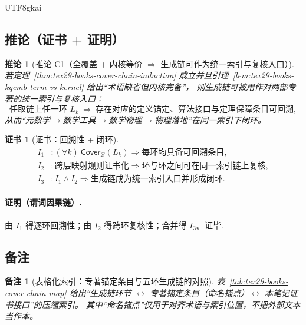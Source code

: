 \documentclass[12pt]{article}
\newtheorem{corollary}{推论}[section]
\newtheorem{remark}{备注}[section]
\newtheorem{Certificate}{证书}[section]
\newcommand{\KouJing}{\texorpdfstring{表述约定}{表述约定}}
\begin{document}
\begin{CJK*}{UTF8}{gkai}
\subsection{推论（证书 + 证明）}
\label{subsec:tex29-books-cover-chain-corollary}

\begin{corollary}[推论 C1（全覆盖 + 内核等价 $\Rightarrow$ 生成链可作为统一索引与复核入口）]
\label{cor:tex29-books-cover-chain-index}
若定理~\ref{thm:tex29-books-cover-chain-induction} 成立并且引理~\ref{lem:tex29-books-kqemb-term-vs-kernel} 给出“术语缺省但内核完备”，
则生成链可被用作对两部专著的统一索引与复核入口：
\[
  \text{任取链上任一环 }L_k\ \Rightarrow\ \text{存在对应的定义锚定、算法接口与定理保障条目可回溯},
\]
从而“元数学$\to$数学工具$\to$数学物理$\to$物理落地”在同一索引下闭环。
\end{corollary}

\begin{Certificate}[证书：回溯性 + 闭环]
\label{cert:tex29-books-cover-chain-index}
\[
\begin{aligned}
  I_1 &: (\forall k)\ \mathsf{Cover}_{\mathcal{B}}(L_k)\Rightarrow \text{每环均具备可回溯条目},\\
  I_2 &: \text{跨层映射规则证书化}\Rightarrow \text{环与环之间可在同一索引链上复核},\\
  I_3 &: I_1\wedge I_2\Rightarrow \text{生成链成为统一索引入口并形成闭环}.
\end{aligned}
\]
\end{Certificate}

\paragraph{证明（谓词因果链）.}
由 $I_1$ 得逐环回溯性；由 $I_2$ 得跨环复核性；合并得 $I_3$。证毕.

\subsection{备注}
\label{subsec:tex29-books-cover-chain-remarks}

\begin{remark}[表格化索引：专著锚定条目与五环生成链的对照]
表~\ref{tab:tex29-books-cover-chain-map} 给出“生成链环节 $\leftrightarrow$ 专著锚定条目（命名锚点）$\leftrightarrow$ 本笔记证书接口”的压缩索引。
其中“命名锚点”仅用于对齐术语与索引位置，不把外部文本当作本。
\end{remark}


\end{CJK*}
\end{document}
